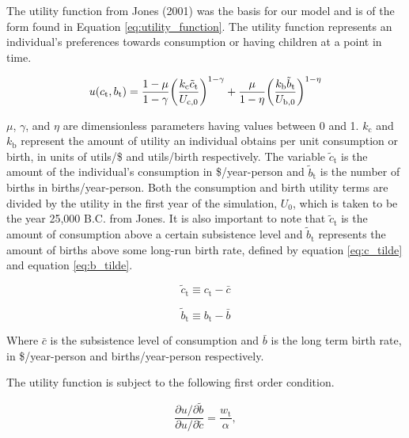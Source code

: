 \documentclass[letterpaper,12pt]{article}
\begin{document}
The utility function from Jones (2001) was the basis for our model and is of the form found in Equation \ref{eq:utility_function}. The utility function represents an individual's preferences towards consumption or having children at a point in time. 

\begin{equation} \label{eq:utility_function}
	u(c_\mathrm{t}, b_\mathrm{t}) = \frac{1-\mu}{1-\gamma} \bigg{(}\frac{k_\mathrm{c} \tilde c_\mathrm{t}}{U_\mathrm{c,0}} \bigg{)}^{1-\gamma} + \frac{\mu}{1-\eta} \bigg{(}\frac{k_\mathrm{b} \tilde b_\mathrm{t}}{U_\mathrm{b,0}} \bigg{)}^{1-\eta}
\end{equation}

\noindent $\mu$, $\gamma$, and $\eta$ are dimensionless parameters having values between 0 and 1. $k_\mathrm{c}$ and $k_\mathrm{b}$ represent the amount of utility an individual obtains per unit consumption or birth, in units of utils/\$ and utils/birth respectively. The variable $\tilde c_\mathrm{t}$ is the amount of the individual's consumption in \$/year-person and $\tilde b_\mathrm{t}$ is the number of births in births/year-person. Both the consumption and birth utility terms are divided by the utility in the first year of the simulation, $U_\mathrm{0}$, which is taken to be the year 25,000 B.C. from Jones. It is also important to note that $\tilde c_\mathrm{t}$ is the amount of consumption above a certain subsistence level and $\tilde b_\mathrm{t}$ represents the amount of births above some long-run birth rate, defined by equation \ref{eq:c_tilde} and equation \ref{eq:b_tilde}.

\begin{equation} \label{eq:c_tilde}
	\tilde c_\mathrm{t} \equiv c_\mathrm{t} - \bar c
\end{equation}

\begin{equation} \label{eq:b_tilde}
	\tilde b_\mathrm{t} \equiv b_\mathrm{t} - \bar b
\end{equation}

Where $\bar c$ is the subsistence level of consumption and $\bar b$ is the long term birth rate, in \$/year-person and births/year-person respectively.

The utility function is subject to the following first order condition.

\begin{equation} \label{eq:first_order_condition}
	\frac{\partial u/ \partial\tilde b}{\partial u/ \partial\tilde c} = \frac{w_\mathrm{t}}{\alpha},
\end{equation}
\end{document}
